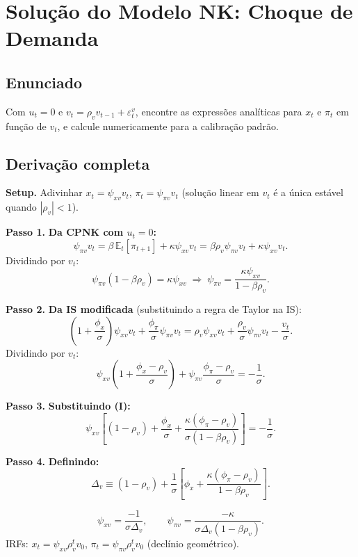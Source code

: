 \documentclass[12pt, a4paper]{article}
\newcommand{\E}{\mathbb{E}}
\begin{document}
\section{Solução do Modelo NK: Choque de Demanda}

\subsection*{Enunciado}
Com $u_t = 0$ e $v_t = \rho_v v_{t-1} + \varepsilon_t^v$, encontre as expressões
analíticas para $x_t$ e $\pi_t$ em função de $v_t$, e calcule numericamente para
a calibração padrão.

\subsection*{Derivação completa}

\textbf{Setup.} Adivinhar $x_t = \psi_{xv}v_t$, $\pi_t = \psi_{\pi v}v_t$ (solução linear
em $v_t$ é a única estável quando $|\rho_v| < 1$).

\textbf{Passo 1.} \textbf{Da CPNK com $u_t=0$:}
\[
\psi_{\pi v}v_t = \beta\,\E_t[\pi_{t+1}] + \kappa\psi_{xv}v_t
= \beta\rho_v\psi_{\pi v}v_t + \kappa\psi_{xv}v_t.
\]
Dividindo por $v_t$:
\[
\psi_{\pi v}(1-\beta\rho_v) = \kappa\psi_{xv}
\;\Rightarrow\;
\psi_{\pi v} = \frac{\kappa\psi_{xv}}{1-\beta\rho_v}. \tag{I}
\]

\textbf{Passo 2.} \textbf{Da IS modificada} (substituindo a regra de Taylor na IS):
\[
\left(1 + \frac{\phi_x}{\sigma}\right)\psi_{xv}v_t + \frac{\phi_\pi}{\sigma}\psi_{\pi v}v_t
= \rho_v\psi_{xv}v_t + \frac{\rho_v}{\sigma}\psi_{\pi v}v_t - \frac{v_t}{\sigma}.
\]
Dividindo por $v_t$:
\[
\psi_{xv}\!\left(1 + \frac{\phi_x-\rho_v}{\sigma}\right)
+ \psi_{\pi v}\!\frac{\phi_\pi-\rho_v}{\sigma} = -\frac{1}{\sigma}.
\]

\textbf{Passo 3.} \textbf{Substituindo (I):}
\[
\psi_{xv}\!\left[(1-\rho_v) + \frac{\phi_x}{\sigma}
  + \frac{\kappa(\phi_\pi-\rho_v)}{\sigma(1-\beta\rho_v)}\right] = -\frac{1}{\sigma}.
\]

\textbf{Passo 4.} \textbf{Definindo:}
\[
\Delta_v \equiv (1-\rho_v) + \frac{1}{\sigma}\!\left[\phi_x
  + \frac{\kappa(\phi_\pi-\rho_v)}{1-\beta\rho_v}\right].
\]

\begin{resultbox}[title={Solução analítica para choque de demanda (Q9)}]
\[
\boxed{
\psi_{xv} = \frac{-1}{\sigma\Delta_v},\qquad
\psi_{\pi v} = \frac{-\kappa}{\sigma\Delta_v(1-\beta\rho_v)}.
}
\]
IRFs: $x_t = \psi_{xv}\rho_v^t v_0$, $\pi_t = \psi_{\pi v}\rho_v^t v_0$ (declínio geométrico).
\end{resultbox}
\end{document}
